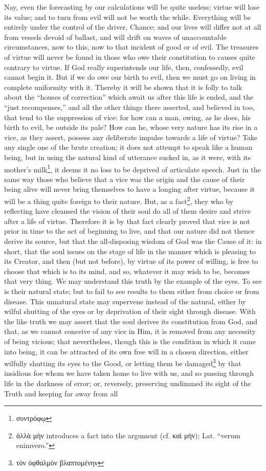 Nay, even the forecasting by our calculations will be quite useless; virtue will lose its value; and to turn from evil will not be worth the while. Everything will be entirely under the control of the driver, Chance; and our lives will differ not at all from vessels devoid of ballast, and will drift on waves of unaccountable circumstances, now to this, now to that incident of good or of evil. The treasures of virtue will never be found in those who owe their constitution to causes quite contrary to virtue. If God really superintends our life, then, confessedly, evil cannot begin it. But if we do owe our birth to evil, then we must go on living in complete uniformity with it. Thereby it will be shown that it is folly to talk about the “houses of correction” which await us after this life is ended, and the “just recompenses,” and all the other things there asserted, and believed in too, that tend to the suppression of vice: for how can a man, owing, as he does, his birth to evil, be outside its pale? How can he, whose very nature has its rise in a vice, as they assert, possess any deliberate impulse towards a life of virtue? Take any single one of the brute creation; it does not attempt to speak like a human being, but in using the natural kind of utterance sucked in, as it were, with its mother’s milk\footnote{\textgreek{συντρόφῳ}}, it deems it no loss to be deprived of articulate speech. Just in the same way those who believe that a vice was the origin and the cause of their being alive will never bring themselves to have a longing after virtue, because it will be a thing quite foreign to their nature. But, as a fact\footnote{\textgreek{ἀλλὰ μὴν} introduces a fact into the argument (cf. \textgreek{καὶ μὴν}); Lat. “verum enimvero.”}, they who by reflecting have cleansed the vision of their soul do all of them desire and strive after a life of virtue. Therefore it is by that fact clearly proved that vice is not prior in time to the act of beginning to live, and that our nature did not thence derive its source, but that the all-disposing wisdom of God was the Cause of it: in short, that the soul issues on the stage of life in the manner which is pleasing to its Creator, and then (but not before), by virtue of its power of willing, is free to choose that which is to its mind, and so, whatever it may wish to be, becomes that very thing. We may understand this truth by the example of the eyes. To see is their natural state; but to fail to see results to them either from choice or from disease. This unnatural state may supervene instead of the natural, either by wilful shutting of the eyes or by deprivation of their sight through disease. With the like truth we may assert that the soul derives its constitution from God, and that, as we cannot conceive of any vice in Him, it is removed from any necessity of being vicious; that nevertheless, though this is the condition in which it came into being, it can be attracted of its own free will in a chosen direction, either wilfully shutting its eyes to the Good, or letting them be damaged\footnote{\textgreek{τὸν ὀφθαλμὸν βλαπτομένην}} by that insidious foe whom we have taken home to live with us, and so passing through life in the darkness of error; or, reversely, preserving undimmed its sight of the Truth and keeping far away from all 